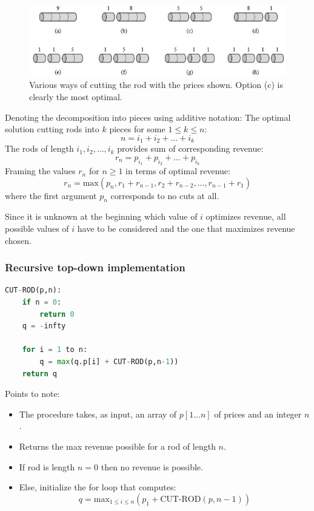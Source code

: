 \documentclass[10pt,a4paper]{article}
\begin{document}
\begin{figure} [h!]
    \centering
    \includegraphics[scale=0.7]{Ways.JPG}
    \caption{Various ways of cutting the rod with the prices shown. Option (c) is clearly the most optimal.}
\end{figure}

Denoting the decomposition into pieces using additive notation: The optimal solution cutting rods
into $k$ pieces for some $1\leq k \leq n$:
$$
    n = i_1 + i_2 + ... + i_k
$$
The rods of length $i_1,i_2,\dots,i_k$ provides sum of corresponding revenue:
$$
    r_n = p_{i_1}+p_{i_2}+\dots+p_{i_k}
$$
Framing the values $r_n$ for $n\geq 1$ in terms of optimal revenue:
$$
    r_n = \text{max}(p_n,r_1+r_{n-1},r_2+r_{n-2},...,r_{n-1}+r_1)
$$
where the first argument $p_n$ corresponds to no cuts at all. \par 

Since it is unknown at the beginning which value of $i$ optimizes revenue, all possible values of
$i$ have to be considered and the one that maximizes revenue chosen.


\pagebreak

\subsubsection{Recursive top-down implementation}

\begin{lstlisting}[language = python]
CUT-ROD(p,n):
    if n = 0:
        return 0
    q = -infty

    for i = 1 to n:
        q = max(q.p[i] + CUT-ROD(p,n-1))
    return q
\end{lstlisting}

Points to note:
\begin{itemize}
    \item The procedure takes, as input, an array of $p[1...n]$ of prices and an integer $n$.
    \item Returns the max revenue possible for a rod of length $n$.
    \item If rod is length $n=0$ then no revenue is possible.
    \item Else, initialize the for loop that computes:
    $$
        q=\text{max}_{1\leq i \leq n}(p_1 + \text{CUT-ROD}(p,n-1))
    $$
\end{itemize}
\end{document}
